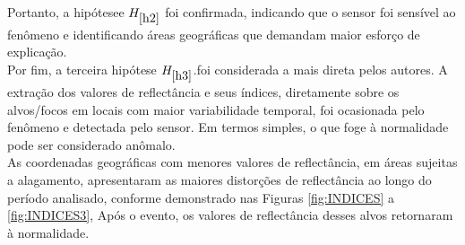  \hspace*{1.25 cm} Portanto, a hipótesee \textbf{\textcolor{blue}{$ H_{\ref{h2}}$}} foi confirmada, indicando que o sensor foi sensível ao fenômeno e identificando áreas geográficas que demandam maior esforço de explicação.\\
 \hspace*{1.25 cm} Por fim, a terceira hipótese \textbf{\textcolor{blue}{$ H_{\ref{h3}}$}}.foi considerada a mais direta pelos autores. A extração dos valores de reflectância e seus índices, diretamente sobre os alvos/focos em locais com maior variabilidade temporal, foi ocasionada pelo fenômeno e detectada pelo sensor. Em termos simples, o que foge à normalidade pode ser considerado anômalo.  \\
\hspace*{1.25 cm} As coordenadas geográficas com menores valores de reflectância, em áreas sujeitas a alagamento, apresentaram as maiores distorções de reflectância ao longo do período analisado, conforme demonstrado nas Figuras \ref{fig:INDICES} a \ref{fig:INDICES3}, Após o evento, os valores de reflectância desses alvos retornaram à normalidade.
 